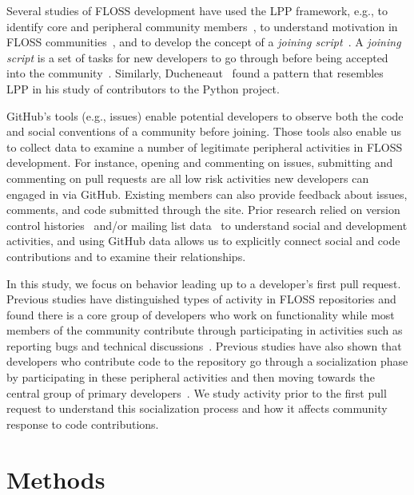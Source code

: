\documentclass{sigchi}
\begin{document}
Several studies of FLOSS development have used the LPP framework, e.g., to
identify core and peripheral community members~\cite{huang_mining_2005}, to
understand motivation in FLOSS communities~\cite{ye_toward_2003}, and to develop
the concept of a \textit{joining script}~\cite{von_krogh_community_2003}. A
\textit{joining script} is a set of tasks for new developers to go through
before being accepted into the community~\cite{von_krogh_community_2003}.
Similarly, Ducheneaut~\cite{ducheneaut_socialization_2005} found a pattern that
resembles LPP in his study of contributors to the Python project. 

GitHub's tools (e.g., issues) enable potential developers to observe both the
code and social conventions of a community before joining. Those tools also
enable us to collect data to examine a number of legitimate peripheral
activities in FLOSS development. For instance, opening and commenting on
issues, submitting and commenting on pull requests are all low risk activities
new developers can engaged in via GitHub. Existing members can also provide
feedback about issues, comments, and code submitted through the site. Prior
research relied on version control histories~\cite{huang_mining_2005} and/or
mailing list data~\cite{ducheneaut_socialization_2005, von_krogh_community_2003}
to understand social and development activities, and using GitHub data allows us
to explicitly connect social and code contributions and to examine their
relationships.

In this study, we focus on behavior leading up to a developer's first pull
request.  Previous studies have distinguished types of activity in FLOSS
repositories and found there is a core group of developers who work on
functionality while most members of the community contribute through
participating in activities such as reporting bugs and technical
discussions~\cite{dinh2005freebsd, mockus2002two}. Previous studies have also
shown that developers who contribute code to the repository go through a
socialization phase by participating in these peripheral activities and then
moving towards the central group of primary
developers~\cite{ducheneaut_socialization_2005, von_krogh_community_2003}. We
study activity prior to the first pull request to understand this socialization
process and how it affects community response to code contributions.

\section{Methods} \label{chap:methods}
\end{document}
